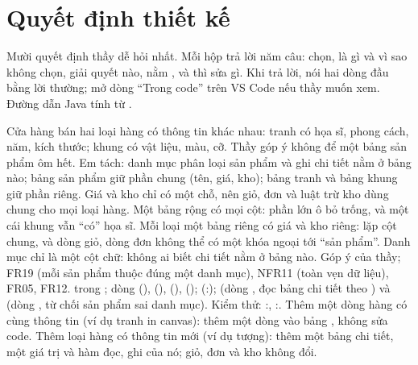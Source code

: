 \section{Quyết định thiết kế}\label{sec:quyetdinh}
Mười quyết định thầy dễ hỏi nhất. Mỗi hộp trả lời năm câu:  chọn,  là gì và vì sao không chọn, giải quyết  nào, nằm , và  thì sửa gì. Khi trả lời, nói hai dòng đầu bằng lời thường; mở dòng ``Trong code'' trên VS Code nếu thầy muốn xem. Đường dẫn Java tính từ .

{Cửa hàng bán hai loại hàng có thông tin khác nhau: tranh có họa sĩ, phong cách, năm, kích thước; khung có vật liệu, màu, cỡ. Thầy góp ý không để một bảng sản phẩm ôm hết. Em tách: danh mục phân loại sản phẩm và ghi chi tiết nằm ở bảng nào; bảng sản phẩm giữ phần chung (tên, giá, kho); bảng tranh và bảng khung giữ phần riêng. Giá và kho chỉ có một chỗ, nên giỏ, đơn và luật trừ kho dùng chung cho mọi loại hàng.}
{Một bảng rộng có mọi cột: phần lớn ô bỏ trống, và một cái khung vẫn ``có'' họa sĩ. Mỗi loại một bảng riêng có giá và kho riêng: lặp cột chung, và dòng giỏ, dòng đơn không thể có một khóa ngoại tới ``sản phẩm''. Danh mục chỉ là một cột chữ: không ai biết chi tiết nằm ở bảng nào.}
{Góp ý của thầy; FR19 (mỗi sản phẩm thuộc đúng một danh mục), NFR11 (toàn vẹn dữ liệu), FR05, FR12.}
{ trong ;  dòng \dongSqlCategory{} (), \dongSqlProduct{} (), \dongSqlPainting{} (), \dongSqlFrame{} ();  (:\dongAccepts);  (dòng \dongToProduct, đọc bảng chi tiết theo ) và  (dòng \dongInsertProduct, từ chối sản phẩm sai danh mục). Kiểm thử: :\dongTestSaveRefuses, :\dongTestAccepts.}
{Thêm một dòng hàng có cùng thông tin (ví dụ tranh in canvas): thêm một dòng vào bảng , không sửa code. Thêm loại hàng có thông tin mới (ví dụ tượng): thêm một bảng chi tiết, một giá trị  và hàm đọc, ghi của nó; giỏ, đơn và kho không đổi.}

